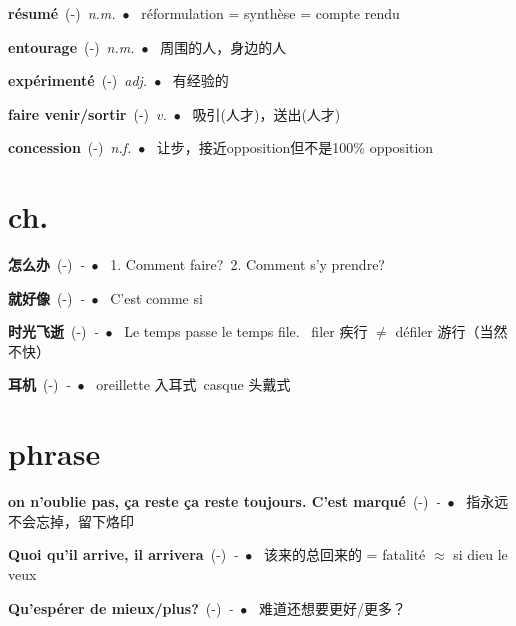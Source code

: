 \documentclass[10pt,a4paper,twoside]{article} %
\newcommand{\entry}[4]{\textbf{#1}\ {(#2)}\ \textit{#3}\ $\bullet$\ {#4}} %
\begin{document}
\begin{CJK*}{UTF8}{gkai}
\begin{multicols}{2}
\entry{résumé}{-}{n.m.}
{
réformulation = synthèse = compte rendu
}

\entry{entourage}{-}{n.m.}
{
周围的人，身边的人
}

\entry{expérimenté}{-}{adj.}
{
有经验的
}

\entry{faire venir/sortir}{-}{v.}
{
吸引(人才)，送出(人才)
}

\entry{concession}{-}{n.f.}
{
让步，接近opposition但不是100\% opposition
}

\end{multicols}


\section*{ch.}

\begin{multicols}{2}

\entry{怎么办}{-}{-}
{
1. Comment faire?\ 
2. Comment s'y prendre?\ 
}

\entry{就好像}{-}{-}
{
C'est comme si 
}

\entry{时光飞逝}{-}{-}
{
Le temps passe le temps file. \ 
filer 疾行 $\neq$ défiler 游行（当然不快） 
}

\entry{耳机}{-}{-}
{
oreillette 入耳式\ 
casque     头戴式 
}

\end{multicols}



\section*{phrase}

\begin{multicols}{2}

\entry{on n'oublie pas, ça reste ça reste toujours. C'est marqué}{-}{-}
{
指永远不会忘掉，留下烙印
}

\entry{Quoi qu'il arrive, il arrivera}{-}{-}
{
该来的总回来的 = fatalité $\approx$ si dieu le veux
}

\entry{Qu'espérer de mieux/plus?}{-}{-}
{
难道还想要更好/更多？
}


\end{multicols}
\end{CJK*}
\end{document}
